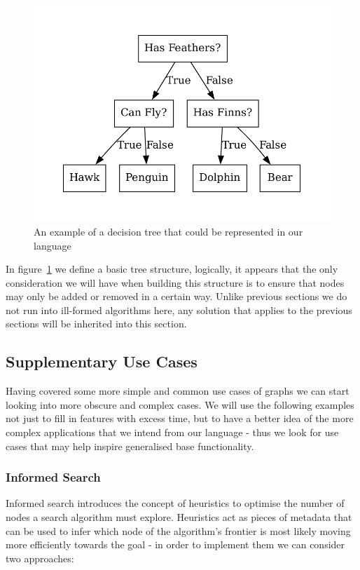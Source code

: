 \begin{figure}[H]
    \centering
    \includegraphics[width=12cm]{figures/example_graphs/decision_tree.gv}
    \caption{An example of a decision tree that could be represented in our language}
    \label{fig:example_decision_tree}
\end{figure}

In figure~\ref{fig:example_decision_tree} we define a basic tree structure, logically, it appears that the only
consideration we will have when building this structure is to ensure that nodes may only be added or removed in a
certain way.
Unlike previous sections we do not run into ill-formed algorithms here, any solution that applies to the previous
sections will be inherited into this section.

\subsection{Supplementary Use Cases}\label{subsec:supplementary-use-cases}
Having covered some more simple and common use cases of graphs we can start looking into more obscure and complex
cases.
We will use the following examples not just to fill in features with excess time, but to have a better idea of the
more complex applications that we intend from our language - thus we look for use cases that may help inspire
generalised base functionality.

\subsubsection{Informed Search}
Informed search introduces the concept of heuristics to optimise the number of nodes a search algorithm must explore.
Heuristics act as pieces of metadata that can be used to infer which node of the algorithm's frontier is most likely 
moving more efficiently towards the goal - in order to implement them we can consider two approaches:

